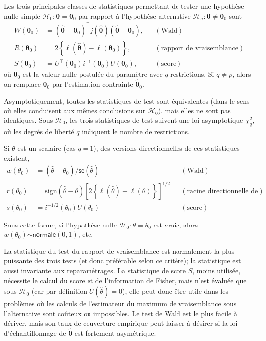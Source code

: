 \documentclass[
  11pt,
  letterpaper,
]{scrbook}
\theoremstyle{definition}
\theoremstyle{definition}
\theoremstyle{plain}
\theoremstyle{plain}
\theoremstyle{remark}
\begin{document}
Les trois principales classes de statistiques permettant de tester une
hypothèse nulle simple
\(\mathscr{H}_0 : \boldsymbol{\theta}=\boldsymbol{\theta}_0\) par
rapport à l'hypothèse alternative
\(\mathscr{H}_a : \boldsymbol{\theta} \neq \boldsymbol{\theta}_0\) sont
\begin{align*}
 W(\boldsymbol{\theta}_0) &= (\widehat{\boldsymbol{\theta}}-\boldsymbol{\theta}_0)^\top j(\widehat{\boldsymbol{\theta}})(\widehat{\boldsymbol{\theta}}-\boldsymbol{\theta}_0), &&(\text{Wald}) \\
 R(\boldsymbol{\theta}_0) &= 2 \left\{ \ell(\widehat{\boldsymbol{\theta}})-\ell(\boldsymbol{\theta}_0)\right\}, &&(\text{rapport de vraisemblance})\\
 S(\boldsymbol{\theta}_0) &= U^\top(\boldsymbol{\theta}_0)i^{-1}(\boldsymbol{\theta}_0)U(\boldsymbol{\theta}_0), && (\text{score})
\end{align*} où \(\boldsymbol{\theta}_0\) est la valeur nulle postulée
du paramètre avec \(q\) restrictions. Si \(q \neq p\), alors on remplace
\(\boldsymbol{\theta}_0\) par l'estimation contrainte
\(\widehat{\boldsymbol{\theta}}_0\).

Asymptotiquement, toutes les statistiques de test sont équivalentes
(dans le sens où elles conduisent aux mêmes conclusions sur
\(\mathscr{H}_0\)), mais elles ne sont pas identiques. Sous
\(\mathscr{H}_0\), les trois statistiques de test suivent une loi
asymptotique \(\chi^2_q\), où les degrés de liberté \(q\) indiquent le
nombre de restrictions.

Si \(\theta\) est un scalaire (cas \(q=1\)), des versions
directionnelles de ces statistiques existent, \begin{align*}
w(\theta_0)&=(\widehat{\theta}-\theta_0)/\mathsf{se}(\widehat{\theta}) &&(\text{Wald}) \\
r({\theta_0}) &= \mathrm{sign}(\widehat{\theta}-\theta)\left[2
\left\{\ell(\widehat{\theta})-\ell(\theta)\right\}\right]^{1/2} &&(\text{racine directionnelle de vraisemblance}) \\
s(\theta_0)&=i^{-1/2}(\theta_0)U(\theta_0) &&(\text{score}) 
\end{align*}

Sous cette forme, si l'hypothèse nulle
\(\mathscr{H}_0: \theta = \theta_0\) est vraie, alors
\(w(\theta_0)\stackrel{\cdot}{\sim} \mathsf{normale}(0,1)\), etc.

La statistique du test du rapport de vraisemblance est normalement la
plus puissante des trois tests (et donc préférable selon ce critère); la
statistique est aussi invariante aux reparamétrages. La statistique de
score \(S\), moins utilisée, nécessite le calcul du score et de
l'information de Fisher, mais n'est évaluée que sous \(\mathscr{H}_0\)
(car par définition \(U(\widehat{\theta})=0\)), elle peut donc être
utile dans les problèmes où les calculs de l'estimateur du maximum de
vraisemblance sous l'alternative sont coûteux ou impossibles. Le test de
Wald est le plus facile à dériver, mais son taux de couverture empirique
peut laisser à désirer si la loi d'échantillonnage de
\(\widehat{\boldsymbol{\theta}}\) est fortement asymétrique.
\end{document}
